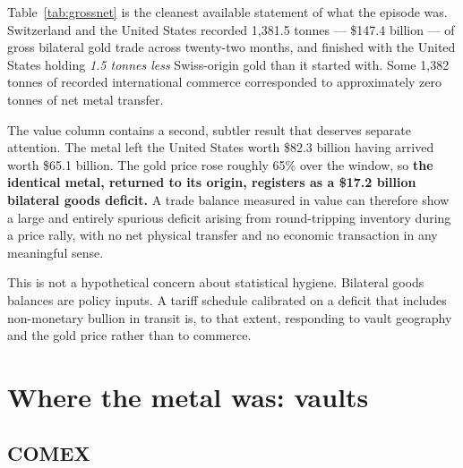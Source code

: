 \documentclass[11pt,a4paper]{article}
\begin{document}
Table~\ref{tab:grossnet} is the cleanest available statement of what the episode was.
Switzerland and the United States recorded 1{,}381.5 tonnes --- \$147.4 billion --- of gross
bilateral gold trade across twenty-two months, and finished with the United States holding
\emph{1.5 tonnes less} Swiss-origin gold than it started with. Some 1{,}382 tonnes of recorded
international commerce corresponded to approximately zero tonnes of net metal transfer.

The value column contains a second, subtler result that deserves separate attention. The metal
left the United States worth \$82.3 billion having arrived worth \$65.1 billion. The gold price
rose roughly 65\% over the window, so \textbf{the identical metal, returned to its origin,
registers as a \$17.2 billion bilateral goods deficit.} A trade balance measured in value can
therefore show a large and entirely spurious deficit arising from round-tripping inventory
during a price rally, with no net physical transfer and no economic transaction in any
meaningful sense.

This is not a hypothetical concern about statistical hygiene. Bilateral goods balances are
policy inputs. A tariff schedule calibrated on a deficit that includes non-monetary bullion in
transit is, to that extent, responding to vault geography and the gold price rather than to
commerce.

\section{Where the metal was: vaults}
\label{sec:comex}

\subsection{COMEX}
\end{document}
